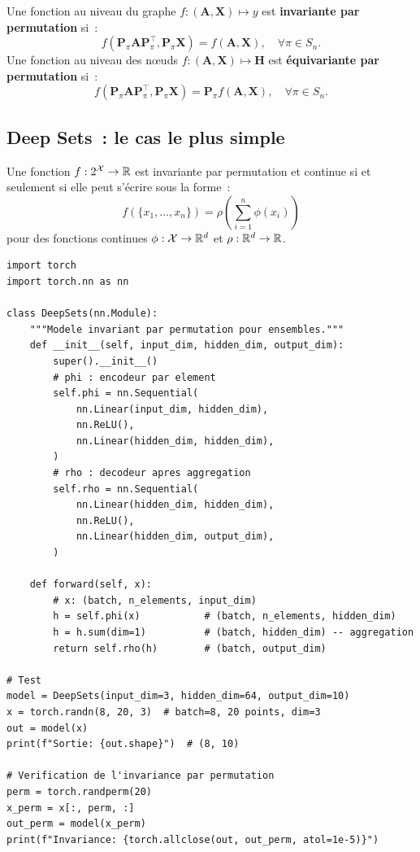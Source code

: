 \begin{definition}
Une fonction au niveau du graphe $f: (\mathbf{A}, \mathbf{X}) \mapsto y$
est \textbf{invariante par permutation} si~:
\[
    f(\mathbf{P}_\pi \mathbf{A} \mathbf{P}_\pi^\top, \mathbf{P}_\pi \mathbf{X})
    = f(\mathbf{A}, \mathbf{X}), \quad \forall \pi \in S_n.
\]
Une fonction au niveau des n\oe uds $f: (\mathbf{A}, \mathbf{X}) \mapsto \mathbf{H}$
est \textbf{\'equivariante par permutation} si~:
\[
    f(\mathbf{P}_\pi \mathbf{A} \mathbf{P}_\pi^\top, \mathbf{P}_\pi \mathbf{X})
    = \mathbf{P}_\pi f(\mathbf{A}, \mathbf{X}), \quad \forall \pi \in S_n.
\]
\end{definition}

\subsection{Deep Sets~: le cas le plus simple}

\begin{theoreme}[Zaheer et al., 2017]
Une fonction $f: 2^{\mathcal{X}} \to \mathbb{R}$ est invariante par permutation et
continue si et seulement si elle peut s'\'ecrire sous la forme~:
\[
    f(\{x_1, \ldots, x_n\}) = \rho\!\left(\sum_{i=1}^{n} \phi(x_i)\right)
\]
pour des fonctions continues $\phi: \mathcal{X} \to \mathbb{R}^d$ et
$\rho: \mathbb{R}^d \to \mathbb{R}$.
\end{theoreme}

\begin{codeblock}[title=\textbf{Impl\'ementation Deep Sets en PyTorch}]
\begin{verbatim}
import torch
import torch.nn as nn

class DeepSets(nn.Module):
    """Modele invariant par permutation pour ensembles."""
    def __init__(self, input_dim, hidden_dim, output_dim):
        super().__init__()
        # phi : encodeur par element
        self.phi = nn.Sequential(
            nn.Linear(input_dim, hidden_dim),
            nn.ReLU(),
            nn.Linear(hidden_dim, hidden_dim),
        )
        # rho : decodeur apres aggregation
        self.rho = nn.Sequential(
            nn.Linear(hidden_dim, hidden_dim),
            nn.ReLU(),
            nn.Linear(hidden_dim, output_dim),
        )

    def forward(self, x):
        # x: (batch, n_elements, input_dim)
        h = self.phi(x)           # (batch, n_elements, hidden_dim)
        h = h.sum(dim=1)          # (batch, hidden_dim) -- aggregation
        return self.rho(h)        # (batch, output_dim)

# Test
model = DeepSets(input_dim=3, hidden_dim=64, output_dim=10)
x = torch.randn(8, 20, 3)  # batch=8, 20 points, dim=3
out = model(x)
print(f"Sortie: {out.shape}")  # (8, 10)

# Verification de l'invariance par permutation
perm = torch.randperm(20)
x_perm = x[:, perm, :]
out_perm = model(x_perm)
print(f"Invariance: {torch.allclose(out, out_perm, atol=1e-5)}")
\end{verbatim}
\end{codeblock}

